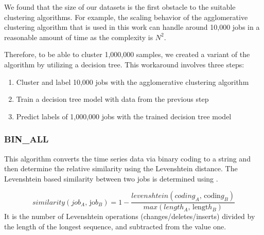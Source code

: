 \documentclass{jhps}
\begin{document}
We found that the size of our datasets is the first obstacle to the suitable clustering algorithms.
For example, the scaling behavior of the agglomerative clustering algorithm that is used in this work can handle around 10,000 jobs in a reasonable amount of time as the complexity is \(N^{2}\).

Therefore, to be able to cluster 1,000,000 samples, we created a variant of the algorithm by utilizing a decision tree.
This workaround involves three steps:

\begin{enumerate}
 \item Cluster and label 10,000 jobs with the agglomerative clustering algorithm
 \item Train a decision tree model with data from the previous step
 \item Predict labels of 1,000,000 jobs with the trained decision tree model
\end{enumerate}

\subsubsection{BIN\_ALL}
This algorithm converts the time series data via binary coding to a string and then determine the relative similarity using the Levenshtein distance.
The Levenshtein based similarity between two jobs is determined using .

\begin{equation}
similarity \left( job_{A}\text{, jo}b_{B} \right) =1- \frac{levenshtein \left( coding_{A}\text{, codin}g_{B} \right) }{max \left( length_{A}\text{, lengt}h_{B} \right) } \label{eq:sim:bin_all}
\end{equation}
It is the number of Levenshtein operations (changes/deletes/inserts) divided by the length of the longest sequence, and subtracted from the value one.

\end{document}
